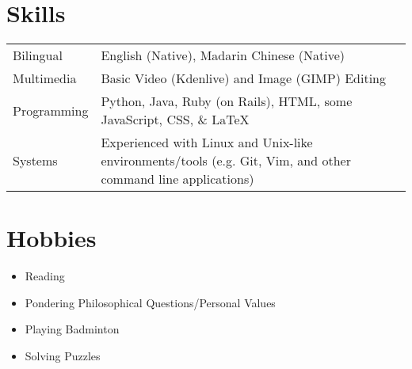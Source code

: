 \documentclass[letter, 12pt]{article}
\begin{document}
\section{Skills}

\begin{tabularx}{\linewidth}{@{}l X@{}}
    Bilingual &  English (Native), Madarin Chinese (Native) \\
    Multimedia & Basic Video (Kdenlive) and Image (GIMP) Editing \\
    Programming & Python, Java, Ruby (on Rails), HTML, some JavaScript, CSS, \& \LaTeX \\
    Systems & Experienced with Linux and Unix-like environments/tools (e.g. Git, Vim, and other command line applications) \\
\end{tabularx}

\section{Hobbies}

\begin{itemize}
    \item Reading
    \item Pondering Philosophical Questions/Personal Values
    \item Playing Badminton
    \item Solving Puzzles
\end{itemize}

\vfill
{}
\end{document}
